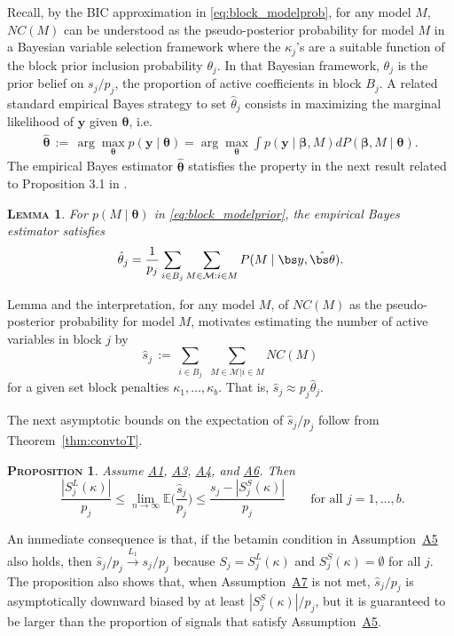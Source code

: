 \documentclass[
  12pt]{article}
\newcommand{\E}{\mathbb{E}}
\newcommand{\M}{\mathcal{M}}
\newcommand{\by}{\mathbf{y}}
\newcommand{\bbeta}{\boldsymbol{\beta}}
\newcommand{\btheta}{\boldsymbol{\theta}}
\newtheorem{prop}[thm]{\textsc{Proposition}}
\newtheorem{lem}[thm]{\textsc{Lemma}}
\begin{document}
Recall, by the BIC approximation in \eqref{eq:block_modelprob}, for any model $M$, $NC(M)$ can be understood as the pseudo-posterior probability for model $M$ in a Bayesian variable selection framework where the $\kappa_j$'s are a suitable function of the block prior inclusion probability $\theta_j$. In that Bayesian framework, $\theta_j$ is the prior belief on $s_j/p_j$, the proportion of active coefficients in block $B_j$. A related standard empirical Bayes strategy to set $\hat{\theta}_j$ consists in maximizing the marginal likelihood of $\by$ given $\btheta$, i.e.
\begin{eqnarray}
\hat{\btheta}
\,:=\, \arg\max_{\btheta} p(\by \mid \btheta)=
\arg\max_{\btheta} \int p(\by \mid \bbeta, M) d P(\bbeta, M \mid \btheta).
\nonumber
\end{eqnarray}
The empirical Bayes estimator $\hat{\btheta}$ statisfies the property in the next result related to Proposition 3.1 in \cite{papaspiliopoulos:2025}.
\begin{lem}\label{lem:empiricalbayesinterpret} For $p(M \mid \btheta)$ in \eqref{eq:block_modelprior}, the empirical Bayes estimator satisfies 
$$\hat{\theta}_j= \frac{1}{p_j}\sum_{i\in B_j}\sum_{M\in\M: i\in M}P(M \mid \bs y,\hat{\bs \theta}).$$
\end{lem}
Lemma and the interpretation, for any model $M$, of $NC(M)$ as the pseudo-posterior probability for model $M$, motivates estimating the number of active variables in block $j$ by 
\begin{equation}\label{eq:shat}
    \hat{s}_j \,:=\, \sum_{i\in B_j}\,\,\sum_{M\in \M | i \in M}NC(M)
\end{equation}
for a given set block penalties $\kappa_1,\ldots,\kappa_b$. That is, $\hat{s}_j \approx p_j \hat{\theta}_j$.

The next asymptotic bounds on the expectation of $\hat{s}_j/p_j$ follow from Theorem~\ref{thm:convtoT}.
\begin{prop}
    \label{prop:shatconsistence}
Assume \hyperlink{lab:A1}{A1}, \hyperlink{lab:A3}{A3}, \hyperlink{lab:A4}{A4}, and \hyperlink{lab:A6}{A6}. Then
$$ \,\, \frac{|S^{L}_j(\kappa)|}{p_j}\leq \lim_{n\to\infty}\E\bigg(\frac{\hat{s}_j}{p_j}\bigg)\leq \frac{s_j-|S^{S}_j(\kappa)|}{p_j}\qquad\text{for all }j=1,\ldots,b.$$
\end{prop}
An immediate consequence is that, if the betamin condition in Assumption~\hyperlink{lab:A5}{A5} also holds, then $\hat{s}_j/p_j \stackrel{L_1}{\longrightarrow} s_j/p_j$
because $S_j=S_j^{L}(\kappa)$ and $S_j^{S}(\kappa)=\emptyset$ for all $j$. The proposition also shows that, when Assumption~\hyperlink{lab:A7}{A7} is not met, $\hat{s}_j/p_j$ is asymptotically downward biased by at least $|S^{S}_j(\kappa)|/p_j$, but it is guaranteed to be larger than the proportion of signals that satisfy Assumption~\hyperlink{lab:A5}{A5}.
\end{document}
